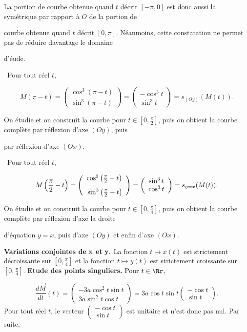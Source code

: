 {\begin{enumerate}
{La portion de courbe obtenue quand $t$ décrit $[-\pi,0]$ est donc aussi la symétrique par rapport à $O$ de la portion de

courbe obtenue quand $t$ décrit $[0,\pi]$. Néanmoins, cette constatation ne permet pas de réduire davantage le domaine

d'éude.

\textbullet~Pour tout réel $t$,

$$M(\pi-t)=\left(\begin{array}{c}
\cos^3(\pi-t)\\
\sin^3(\pi-t)
\end{array}\right)=\left(\begin{array}{c}
-\cos^3t\\
\sin^3t
\end{array}\right)
=s_{(Oy)}(M(t)).$$

On étudie et on construit la courbe pour $t\in\left[0,\frac{\pi}{2}\right]$, puis on obtient la courbe complète par réflexion
d'axe $(Oy)$, puis

par réflexion d'axe $(Ox)$.

\textbullet~Pour tout réel $t$,

$$M\left(\frac{\pi}{2}-t\right)=\left(\begin{array}{c}
\cos^3\left(\frac{\pi}{2}-t\right)\\
\rule{0mm}{6mm}\sin^3\left(\frac{\pi}{2}-t\right)
\end{array}\right)=\left(\begin{array}{c}
\sin^3t\\
\cos^3t
\end{array}\right)
=s_{y=x}(M(t)).$$

On étudie et on construit la courbe pour $t\in\left[0,\frac{\pi}{4}\right]$, puis on obtient la courbe complète par réflexion
d'axe la droite

d'équation $y=x$, puis d'axe $(Oy)$ et enfin d'axe $(Ox)$.\rule{0mm}{5mm}

\textbf{Variations conjointes de} $\bf{x}$ \textbf{et} $\bf{y.}$ La fonction $t\mapsto x(t)$ est strictement
décroissante sur $\left[0,\frac{\pi}{4}\right]$ et la fonction $t\mapsto y(t)$ est strictement croissante sur
$\left[0,\frac{\pi}{4}\right]$.
\textbf{Etude des points singuliers.} Pour $t\in\Rr$,

$$\overrightarrow{\frac{dM}{dt}}(t)=\left(\begin{array}{c}
-3a\cos^2t\sin t\\
3a\sin^2t\cos t
\end{array}\right)=3a\cos t\sin t\left(\begin{array}{c}
-\cos t\\
\sin t
\end{array}\right).$$
Pour tout réel $t$, le vecteur $\left(\begin{array}{c}
-\cos t\\
\sin t
\end{array}\right)$ est unitaire et n'est donc pas nul. Par suite,

}
\end{enumerate}}
